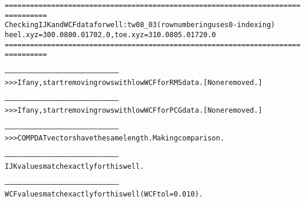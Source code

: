 \begin{alltt}
================================================================================
Checking IJK and WCF data for well: tw08_03 (row numbering uses 0-indexing)
heel.xyz = 300.0 800.0 1702.0, toe.xyz = 310.0 805.0 1720.0
================================================================================

--------------------------------------------------------------------------------
>>> If any, start removing rows with low WCF for RMS data. [None removed.]

--------------------------------------------------------------------------------
>>> If any, start removing rows with low WCF for PCG data. [None removed.]

--------------------------------------------------------------------------------
>>> COMPDAT vectors have the same length. Making comparison.

--------------------------------------------------------------------------------
IJK values match exactly for this well.

--------------------------------------------------------------------------------
WCF values match exactly for this well (WCF tol = 0.010).
\end{alltt}
